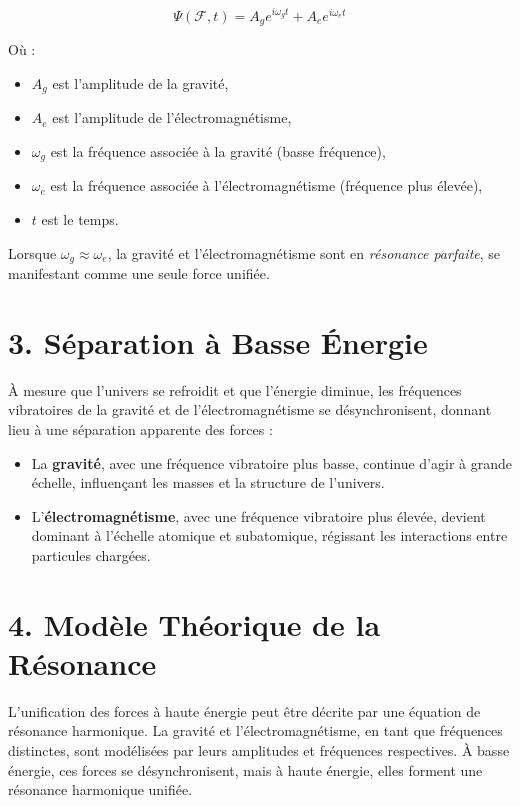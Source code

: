 \documentclass{article}
\begin{document}
\[
\Psi(\mathcal{F}, t) = A_g e^{i\omega_g t} + A_e e^{i\omega_e t}
\]

Où :
\begin{itemize}
    \item \( A_g \) est l'amplitude de la gravité,
    \item \( A_e \) est l'amplitude de l'électromagnétisme,
    \item \( \omega_g \) est la fréquence associée à la gravité (basse fréquence),
    \item \( \omega_e \) est la fréquence associée à l'électromagnétisme (fréquence plus élevée),
    \item \( t \) est le temps.
\end{itemize}

Lorsque \( \omega_g \approx \omega_e \), la gravité et l'électromagnétisme sont en \textit{résonance parfaite}, se manifestant comme une seule force unifiée.

\section{3. Séparation à Basse Énergie}

À mesure que l'univers se refroidit et que l'énergie diminue, les fréquences vibratoires de la gravité et de l'électromagnétisme se désynchronisent, donnant lieu à une séparation apparente des forces :
\begin{itemize}
    \item La \textbf{gravité}, avec une fréquence vibratoire plus basse, continue d'agir à grande échelle, influençant les masses et la structure de l'univers.
    \item L'\textbf{électromagnétisme}, avec une fréquence vibratoire plus élevée, devient dominant à l'échelle atomique et subatomique, régissant les interactions entre particules chargées.
\end{itemize}

\section{4. Modèle Théorique de la Résonance}

L'unification des forces à haute énergie peut être décrite par une équation de résonance harmonique. La gravité et l'électromagnétisme, en tant que fréquences distinctes, sont modélisées par leurs amplitudes et fréquences respectives. À basse énergie, ces forces se désynchronisent, mais à haute énergie, elles forment une résonance harmonique unifiée.
\end{document}

